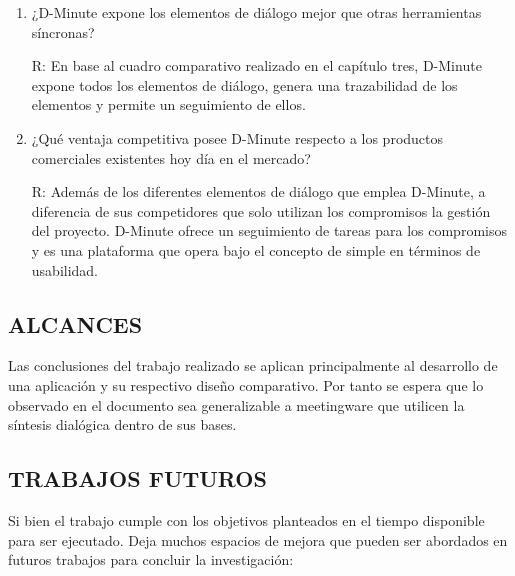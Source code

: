 \begin{enumerate}[1.]
	\item ¿D-Minute expone los elementos de diálogo mejor que otras herramientas síncronas?

R: En base al cuadro comparativo realizado en el capítulo tres, D-Minute expone todos los elementos de diálogo, genera una trazabilidad de los elementos y permite un seguimiento de ellos.

	\item ¿Qué ventaja competitiva posee D-Minute respecto a los productos comerciales existentes hoy día en el mercado?

R: Además de los diferentes elementos de diálogo que emplea D-Minute, a diferencia de sus competidores que solo utilizan los compromisos la gestión del proyecto. D-Minute ofrece un seguimiento de tareas para los compromisos y es una plataforma que opera bajo el concepto de simple en términos de usabilidad.

\end{enumerate}

\subsection{ALCANCES}

Las conclusiones del trabajo realizado se aplican principalmente al desarrollo de una aplicación y su respectivo diseño comparativo. Por tanto se espera que lo observado en el documento sea generalizable a meetingware que utilicen la síntesis dialógica dentro de sus bases. 

\subsection{TRABAJOS FUTUROS}

Si bien el trabajo cumple con los objetivos planteados en el tiempo disponible para ser ejecutado. Deja muchos espacios de mejora que pueden ser abordados en futuros trabajos para concluir la investigación:

